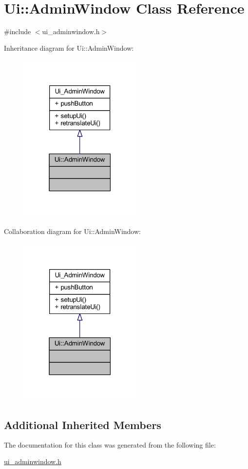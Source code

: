 \hypertarget{class_ui_1_1_admin_window}{}\section{Ui\+:\+:Admin\+Window Class Reference}
\label{class_ui_1_1_admin_window}


{\ttfamily \#include $<$ui\+\_\+adminwindow.\+h$>$}



Inheritance diagram for Ui\+:\+:Admin\+Window\+:\nopagebreak
\begin{figure}[H]
\begin{center}
\leavevmode
\includegraphics[width=174pt]{class_ui_1_1_admin_window__inherit__graph}
\end{center}
\end{figure}


Collaboration diagram for Ui\+:\+:Admin\+Window\+:\nopagebreak
\begin{figure}[H]
\begin{center}
\leavevmode
\includegraphics[width=174pt]{class_ui_1_1_admin_window__coll__graph}
\end{center}
\end{figure}
\subsection*{Additional Inherited Members}


The documentation for this class was generated from the following file\+:\begin{DoxyCompactItemize}
\item 
\hyperlink{ui__adminwindow_8h}{ui\+\_\+adminwindow.\+h}\end{DoxyCompactItemize}
